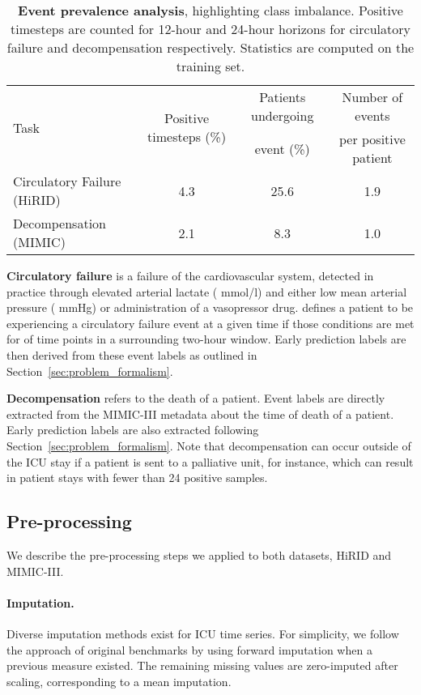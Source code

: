 \documentclass[nohyperref]{article}
\begin{document}
\begin{table}[h]
    \centering
    \caption{\textbf{Event prevalence analysis}, highlighting class imbalance. Positive timesteps are counted for 12-hour and 24-hour horizons for circulatory failure and decompensation respectively. Statistics are computed on the training set.}
    \label{tab:event_prevalence}
\begin{tabular}{lccc}
    \toprule
        \multirow{2}{*}{Task} & \multirow{2}{*}{Positive timesteps (\%)} & Patients undergoing  & Number of events \\
        & & event (\%) & per positive patient\\\midrule
        Circulatory Failure (HiRID) & 4.3 & 25.6 & 1.9 \\
        Decompensation (MIMIC) & 2.1 & 8.3 & 1.0\\
        \bottomrule
    \end{tabular}\end{table}

\textbf{Circulatory failure} is a failure of the cardiovascular system, detected in practice through elevated arterial lactate ( mmol/l) and either low mean arterial pressure ( mmHg) or administration of a vasopressor drug. \citet{yeche2021} defines a patient to be experiencing a circulatory failure event at a given time if those conditions are met for  of time points in a surrounding two-hour window. Early prediction labels are then derived from these event labels as outlined in Section~\ref{sec:problem_formalism}.

\textbf{Decompensation} refers to the death of a patient. Event labels are directly extracted from the MIMIC-III \citep{johnson2016} metadata about the time of death of a patient. Early prediction labels are also extracted following Section~\ref{sec:problem_formalism}. Note that decompensation can occur outside of the ICU stay if a patient is sent to a palliative unit, for instance, which can result in patient stays with fewer than 24 positive samples.



\subsection{Pre-processing}

We describe the pre-processing steps we applied to both datasets, HiRID and MIMIC-III.

\paragraph{Imputation.}
Diverse imputation methods exist for ICU time series. For simplicity, we follow the approach of original benchmarks \citep{harutyunyan2019multitask,yeche2021} by using forward imputation when a previous measure existed. The remaining missing values are zero-imputed after scaling, corresponding to a mean imputation. 
\end{document}
